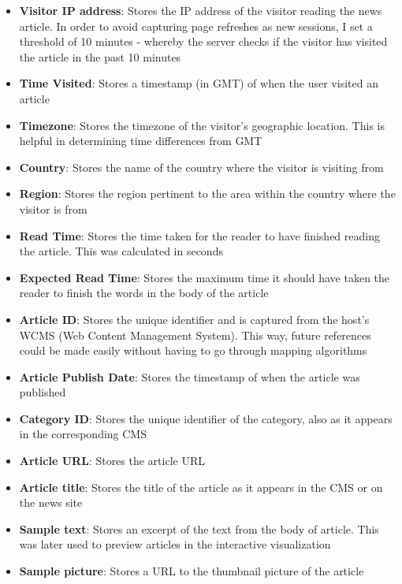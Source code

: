 \documentclass[12pt]{article}
\begin{document}
\begin{itemize}
\item \textbf{Visitor IP address}: Stores the IP address of the visitor reading the news article. In order to avoid capturing page refreshes as new sessions, I set a threshold of 10 minutes - whereby the server checks if the visitor has visited the article in the past 10 minutes
\item \textbf{Time Visited}: Stores a timestamp (in GMT) of when the user visited an article 
\item \textbf{Timezone}: Stores the timezone of the visitor's geographic location. This is helpful in determining time differences from GMT
\item \textbf{Country}: Stores the name of the country where the visitor is visiting from
\item \textbf{Region}: Stores the region pertinent to the area within the country where the visitor is from
\item \textbf{Read Time}: Stores the time taken for the reader to have finished reading the article. This was calculated in seconds
\item \textbf{Expected Read Time}: Stores the maximum time it should have taken the reader to finish the words in the body of the article
\item \textbf{Article ID}: Stores the unique identifier and is captured from the host's WCMS (Web Content Management System). This way, future references could be made easily without having to go through mapping algorithms
\item \textbf{Article Publish Date}: Stores the timestamp of when the article was published
\item \textbf{Category ID}: Stores the unique identifier of the category, also as it appears in the corresponding CMS
\item \textbf{Article URL}: Stores the article URL 
\item \textbf{Article title}: Stores the title of the article as it appears in the CMS or on the news site
\item \textbf{Sample text}: Stores an excerpt of the text from the body of article. This was later used to preview articles in the interactive visualization 
\item \textbf{Sample picture}: Stores a URL to the thumbnail picture of the article

\end{itemize}
\end{document}
